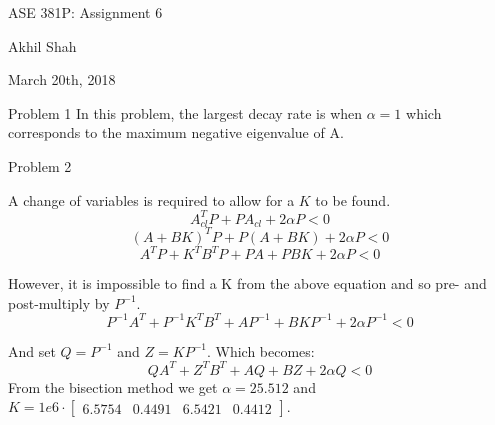 \documentclass{article}
\begin{document}
\begin{center}
	{\huge ASE 381P: Assignment 6}
\end{center}
\begin{center}
	Akhil Shah
\end{center}
\begin{center}
	March 20th, 2018
\end{center}

\noindent
{\large Problem 1}
\newline 
In this problem, the largest decay rate is when $\alpha = 1$ which corresponds to the maximum negative eigenvalue of A. 


\newpage
\noindent
{\large Problem 2}
\newline

A change of variables is required to allow for a $K$ to be found.
$$ A_{cl}^TP + PA_{cl} + 2\alpha P < 0 $$
$$ (A + BK)^TP + P(A + BK) + 2\alpha P < 0 $$
$$ A^TP + K^TB^TP + PA + PBK + 2\alpha P < 0 $$

However, it is impossible to find a K from the above equation and so pre- and post-multiply by $P^{-1}$. 
$$ P^{-1}A^T + P^{-1}K^TB^T + AP^{-1} + BKP^{-1} + 2\alpha P^{-1} < 0 $$

And set $Q = P^{-1}$ and $Z = KP^{-1}$. Which becomes:
$$ QA^T + Z^TB^T + AQ + BZ + 2\alpha Q < 0 $$
From the bisection method we get $\alpha = 25.512$ and $ K = 1e6 \cdot \begin{bmatrix}  6.5754 & 0.4491 & 6.5421 & 0.4412 \end{bmatrix} $. 


\end{document}
